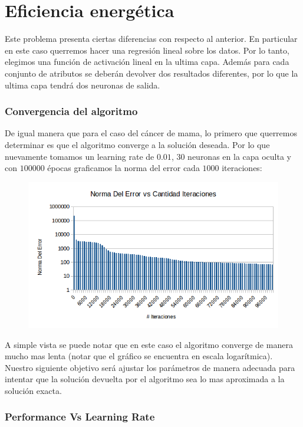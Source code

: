 \section{Eficiencia energética} 

Este problema presenta ciertas diferencias con respecto al anterior. En particular en este caso querremos hacer una regresión lineal sobre los datos. Por lo tanto, elegimos una función de activación lineal en la ultima capa. Además para cada conjunto de atributos se deberán devolver dos resultados diferentes, por lo que la ultima capa tendrá dos neuronas de salida.

\subsubsection{Convergencia del algoritmo}

De igual manera que para el caso del cáncer de mama, lo primero que querremos determinar es que el algoritmo converge a la solución deseada. Por lo que nuevamente tomamos un learning rate de $0.01$, $30$ neuronas en la capa oculta y con $100000$ épocas graficamos la norma del error cada $1000$ iteraciones:


\begin{figure}[h!]
  \centering
    \includegraphics[scale=0.4]{ej2/convergencia.png}
\end{figure}

A simple vista se puede notar que en este caso el algoritmo converge de manera mucho mas lenta (notar que el gráfico se encuentra en escala logarítmica). Nuestro siguiente objetivo será ajustar los parámetros de manera adecuada para intentar que la solución devuelta por el algoritmo sea lo mas aproximada a la solución exacta.

\subsubsection{Performance Vs Learning Rate}

